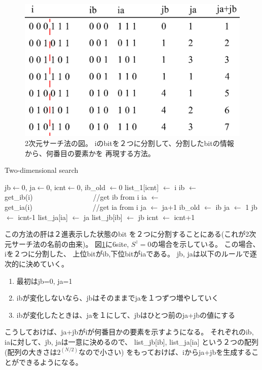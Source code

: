\documentclass[prb,aps,showpacs,preprint,nofootinbib]{revtex4}
\newcommand{\lef}{\leftarrow}
\begin{document}
\begin{figure}[h!]
        \begin{center}
                \includegraphics[width=12cm,clip]{2DSearch.eps}
        \end{center}
\caption{2次元サーチ法の図。
iのbitを２つに分割して、分割したbitの情報から、何番目の要素かを
再現する方法。}
\label{fig:2DSearch}
\end{figure}


\begin{algorithm}                      
\caption{Two-dimensional search}         
\begin{algorithmic}                  
\STATE jb$\lef 0$, ja$\lef 0$, icnt$\lef 0$, ib\_old $\lef 0$
\STATE list\_1[icnt] $\lef$ i
\STATE ib $\lef$ get\_ib(i)~~~~~~~~~~~~~~~~~//get ib from i
\STATE ia $\lef$ get\_ia(i)~~~~~~~~~~~~~~~~~//get ia from i
  \STATE ja $\lef$ ja+1
  \ELSE
  \STATE ib\_old $\lef$ ib
  \STATE ja $\lef$ 1
  \STATE jb $\lef$ icnt-1
  \ENDIF
\STATE  list\_ja[ia] $\lef$ ja
\STATE  list\_jb[ib] $\lef$ jb
\STATE  icnt $\lef$ icnt+1
\ENDIF
\ENDFOR
\end{algorithmic}
\label{alg:2DSearch}
\end{algorithm}



この方法の肝は２進表示した状態のbit
を２つに分割することにある(これが2次元サーチ法の名前の由来)。
図\ref{fig:2DSearch}に6site, $S^{z}=0$の場合を示している。
この場合、iを２つに分割した、
上位bitがib,下位bitがiaである。
jb, jaは以下のルールで逐次的に決めていく。
\begin{enumerate}
\item 最初はjb=0, ja=1
\item ibが変化しないなら、jbはそのままでjaを１つずつ増やしていく
\item ibが変化したときは、jaを１にして、jbはひとつ前のja+jbの値にする
\end{enumerate}
こうしておけば、ja+jbがiが何番目かの要素を示すようになる。
それぞれのib, iaに対して、jb, jaは一意に決めるので、
list\_jb[ib], list\_ja[ia]
という２つの配列(配列の大きさは$2^(N/2)$なので小さい)
をもっておけば、iからja+jbを生成することができるようになる。
\end{document}

